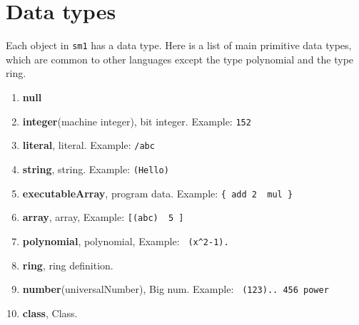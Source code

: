 \section{Data types}

Each object in {\tt sm1} has a data type.
Here is a list of main primitive data types,
which are common to other languages except the type polynomial
and the type ring.
\begin{enumerate}
\item[] {\bf null}
\item[] {\bf integer}(machine integer),  bit integer. \quad Example: {\tt 152}
\item[] {\bf literal}, \quad
   literal. \quad Example: {\tt /abc}
\item[] {\bf string}, \quad
   string. \quad Example: {\tt (Hello)}
\item[] {\bf executableArray}, \quad
   program data. \quad Example: {\tt \{ add\ 2 \ mul \} }
\item[] {\bf array}, \quad
   array, \quad Example: {\tt [(abc) \ 5 ]}
\item[] {\bf polynomial}, \quad
   polynomial, \quad Example: \verb! (x^2-1). !
\item[] {\bf ring}, \quad
   ring definition. 
\item[] {\bf number}(universalNumber), \quad
   Big num. \quad Example: \verb! (123).. 456 power !
\item[] {\bf class}, \quad
   Class.
\end{enumerate}

